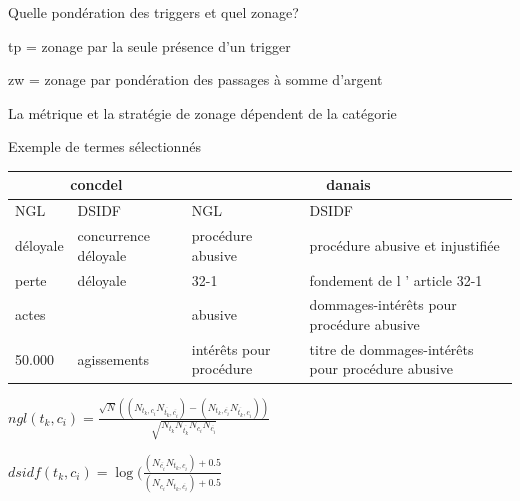 \documentclass[newPxFont,pagenumber]{beamer}
\begin{document}
\begin{frame}{Quelle pondération des triggers et quel  zonage?}
\begin{table}[]
\begin{flushleft}
tp = zonage par la seule présence d'un trigger

zw = zonage par pondération des passages à somme d'argent
\end{flushleft}

\end{table}

La métrique et la stratégie de zonage dépendent de la catégorie

\end{frame}

\begin{frame}{Exemple de termes sélectionnés}
\scriptsize
\begin{table}
\begin{tabular}{ll|lp{}}
 \multicolumn{2}{c|}{concdel} &  \multicolumn{2}{c}{danais} \\ \hline \noalign{\smallskip}
 NGL & DSIDF & NGL & DSIDF \\ \hline
déloyale & concurrence déloyale & procédure abusive       & procédure abusive et injustifiée                  \\ \hline
perte    & déloyale             & 32-1                    & fondement de l ' article 32-1                     \\ \hline
actes    &                      & abusive                 & dommages-intérêts pour procédure abusive          \\ \hline
50.000   & agissements          & intérêts pour procédure & titre de dommages-intérêts pour procédure abusive
\end{tabular}
\end{table}

$ngl(t_k,c_i) = \frac{\sqrt{N} ((N_{t_k,c_i} N_{\overline{t_k},\overline{c_i}}) - (N_{t_k,\overline{c_i}} N_{\overline{t_k},c_i}))}{\sqrt{N_{t_k} N_{\overline{t_k}} N_{c_i} N_{\overline{c_i}}}}$

$dsidf(t_k, c_i)=\log (\frac{(N_{\overline{c_i}}N_{t_k,c_i}) + 0.5}{(N_{c_i}N_{t_k,\overline{c_i}}) + 0.5} $
\end{frame}
\end{document}
